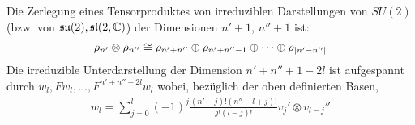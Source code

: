 \begin{satz}
    Die Zerlegung eines Tensorproduktes von irreduziblen Darstellungen
    von $SU(2)$ (bzw. von $\mathfrak{su}(2),\mathfrak{sl}(2,\mathbb{C})$) der Dimensionen $n'+1$, $n''+1$
    ist:
    \begin{align*}
        \rho_{n'} \otimes \rho_{n''} \cong
        \rho_{n' + n''} \oplus \rho_{n' + n'' - 1} \oplus \dotsb \oplus
        \rho_{\left\vert n' - n'' \right\vert}
    \end{align*}    
    Die irreduzible Unterdarstellung der Dimension $n'+n''+1-2l$ ist aufgespannt
    durch $w_l,Fw_l,\dots,F^{n'+n''-2l} w_l$ wobei, bezüglich der oben definierten
    Basen,
    \begin{align*}
        w_l = \sum_{j=0}^l (-1)^j \frac{(n' - j)! (n'' - l + j)!}{j! (l-j)!} v_j' \otimes v_{l-j}''
    \end{align*}
\end{satz}
